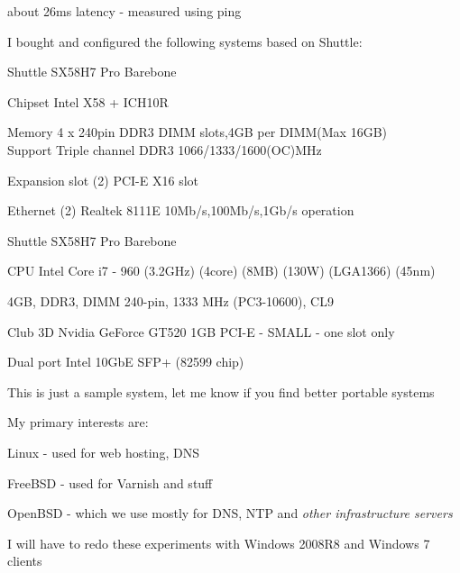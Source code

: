 \documentclass[20pt,landscape,a4paper,footrule]{foils}
\begin{document}
\vskip 1cm
\centerline{about 26ms latency - measured using ping}


I bought and configured the following systems based on Shuttle:
\begin{list2}
\item Shuttle SX58H7 Pro Barebone
\item Chipset	Intel X58 + ICH10R
\item Memory	4 x 240pin DDR3 DIMM slots,4GB per DIMM(Max 16GB)\\
Support Triple channel DDR3 1066/1333/1600(OC)MHz
\item Expansion slot	(2) PCI-E X16 slot
\item Ethernet	(2) Realtek 8111E 10Mb/s,100Mb/s,1Gb/s operation
\end{list2}

\begin{list2}
\item Shuttle SX58H7 Pro Barebone
\item CPU Intel Core i7 - 960 (3.2GHz) (4core) (8MB) (130W) (LGA1366) (45nm)
\item 4GB, DDR3, DIMM 240-pin, 1333 MHz (PC3-10600), CL9
\item Club 3D Nvidia GeForce GT520  1GB PCI-E - SMALL - one slot only
\item Dual port Intel 10GbE SFP+ (82599 chip)
\end{list2}

This is just a sample system, let me know if you find better portable systems



\begin{list1}
\item My primary interests are:
\begin{list2}
\item Linux - used for web hosting, DNS
\item FreeBSD - used for Varnish and stuff
\item OpenBSD - which we use mostly for DNS, NTP and \emph{other infrastructure servers}
\end{list2}
\item I will have to redo these experiments with Windows 2008R8 and Windows 7 clients
\end{list1}
\end{document}
